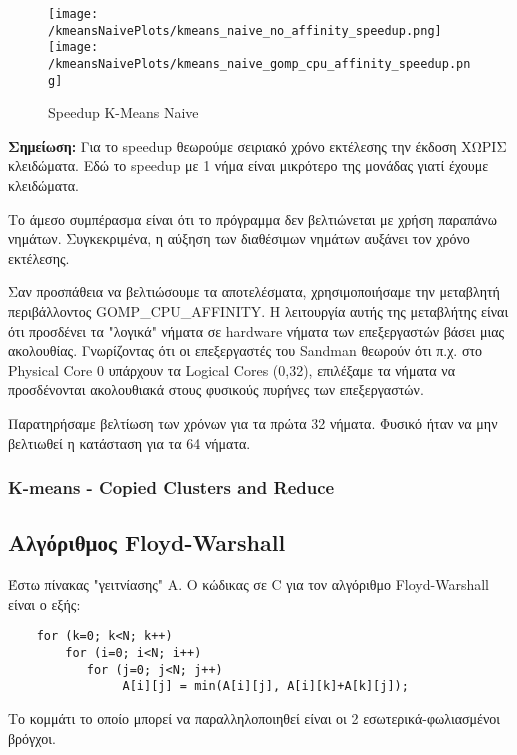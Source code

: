 \documentclass[letterpaper,12pt]{article}
\begin{document}
\begin{figure}[H]
    \centering
    \texttt{[image: /kmeansNaivePlots/kmeans\_naive\_no\_affinity\_speedup.png]}
    \texttt{[image: /kmeansNaivePlots/kmeans\_naive\_gomp\_cpu\_affinity\_speedup.png]}
    \caption{Speedup K-Means Naive}
    \label{fig:Speedup K-Means Naive}
\end{figure}

\textbf{Σημείωση:} Για το speedup θεωρούμε σειριακό χρόνο εκτέλεσης την έκδοση ΧΩΡΙΣ κλειδώματα.
Εδώ το speedup με 1 νήμα είναι μικρότερο της μονάδας γιατί έχουμε κλειδώματα.
\vspace{4pt}

Το άμεσο συμπέρασμα είναι ότι το πρόγραμμα δεν βελτιώνεται με χρήση παραπάνω νημάτων. Συγκεκριμένα, 
η αύξηση των διαθέσιμων νημάτων αυξάνει τον χρόνο εκτέλεσης. 

Σαν προσπάθεια να βελτιώσουμε τα αποτελέσματα, χρησιμοποιήσαμε την μεταβλητή περιβάλλοντος GOMP\_CPU\_AFFINITY.
Η λειτουργία αυτής της μεταβλήτης είναι ότι προσδένει τα "λογικά" νήματα σε hardware νήματα των επεξεργαστών βάσει μιας ακολουθίας.
Γνωρίζοντας ότι οι επεξεργαστές του Sandman θεωρούν ότι π.χ. στο Physical Core 0 υπάρχουν τα Logical Cores (0,32),
επιλέξαμε τα νήματα να προσδένονται ακολουθιακά στους φυσικούς πυρήνες των επεξεργαστών.

Παρατηρήσαμε βελτίωση των χρόνων για τα πρώτα 32 νήματα. Φυσικό ήταν να μην βελτιωθεί η κατάσταση για τα 64 νήματα.


\subsubsection{K-means - Copied Clusters and Reduce}

\subsection{Αλγόριθμος Floyd-Warshall}

Έστω πίνακας "γειτνίασης" Α. Ο κώδικας σε C για τον αλγόριθμο Floyd-Warshall είναι ο εξής:

\begin{lstlisting}
    for (k=0; k<N; k++)
        for (i=0; i<N; i++)
           for (j=0; j<N; j++)
                A[i][j] = min(A[i][j], A[i][k]+A[k][j]);
\end{lstlisting}

Το κομμάτι το οποίο μπορεί να παραλληλοποιηθεί είναι οι 2 εσωτερικά-φωλιασμένοι βρόγχοι.
\end{document}
